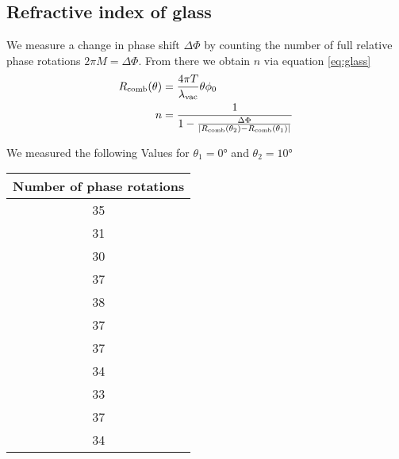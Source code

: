 \subsection{Refractive index of glass}
We measure a change in phase shift $\Delta \Phi$ by counting the number of full
relative phase rotations $2 \pi M = \Delta \Phi$. From there we obtain $n$ via
equation \eqref{eq:glass}
\begin{align}
	R_\text{comb}(\theta) & = \frac{4\pi T}{\lambda_\text{vac}}\theta\phi_0                                                                    \\
	n                  & = \frac{1}{1-\frac{\Delta \Phi}{\left|R_\text{comb}(\theta_{2})-R_\text{comb}(\theta_{1})\right|} } \label{eq:nAtmos}
\end{align}

We measured the following Values for $\theta_1 = 0°$ and $\theta_2 = 10°$
\begin{table}[H]
	\centering
	\begin{tabular}{c}
		\toprule
		Number of phase rotations \\
		\midrule
		35                        \\
		31                        \\
		30                        \\
		37                        \\
		38                        \\
		37                        \\
		37                        \\
		34                        \\
		33                        \\
		37                        \\
		34                        \\
		\bottomrule
	\end{tabular}
\end{table}

